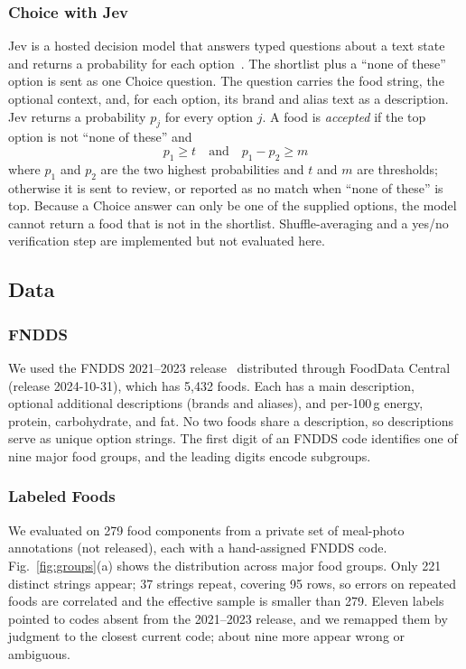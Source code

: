 \documentclass[11pt,journal,onecolumn]{IEEEtran}
\begin{document}
\subsubsection{Choice with Jev}
Jev is a hosted decision model that answers typed questions about a text state and returns a probability for each option~\cite{jev}. The shortlist plus a ``none of these'' option is sent as one Choice question. The question carries the food string, the optional context, and, for each option, its brand and alias text as a description. Jev returns a probability $p_j$ for every option $j$. A food is \emph{accepted} if the top option is not ``none of these'' and
\begin{equation}
p_1\ge t \quad\text{and}\quad p_1-p_2\ge m
\end{equation}
where $p_1$ and $p_2$ are the two highest probabilities and $t$ and $m$ are thresholds; otherwise it is sent to review, or reported as no match when ``none of these'' is top. Because a Choice answer can only be one of the supplied options, the model cannot return a food that is not in the shortlist. Shuffle-averaging and a yes/no verification step are implemented but not evaluated here.

\subsection{Data}
\subsubsection{FNDDS}
We used the FNDDS 2021--2023 release~\cite{fndds} distributed through FoodData Central (release 2024-10-31), which has 5,432 foods. Each has a main description, optional additional descriptions (brands and aliases), and per-100\,g energy, protein, carbohydrate, and fat. No two foods share a description, so descriptions serve as unique option strings. The first digit of an FNDDS code identifies one of nine major food groups, and the leading digits encode subgroups.

\subsubsection{Labeled Foods}
We evaluated on 279 food components from a private set of meal-photo annotations (not released), each with a hand-assigned FNDDS code. Fig.~\ref{fig:groups}(a) shows the distribution across major food groups. Only 221 distinct strings appear; 37 strings repeat, covering 95 rows, so errors on repeated foods are correlated and the effective sample is smaller than 279. Eleven labels pointed to codes absent from the 2021--2023 release, and we remapped them by judgment to the closest current code; about nine more appear wrong or ambiguous.
\end{document}

